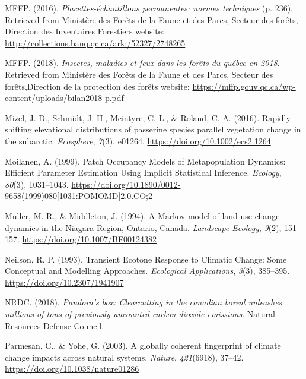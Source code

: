 \documentclass[a4paperpaper,]{article}
\begin{document}
\leavevmode\hypertarget{ref-mffp_placettes-echantillons_2016}{}%
MFFP. (2016). \emph{Placettes-échantillons permanentes: normes
techniques} (p. 236). Retrieved from Ministère des Forêts de la Faune et
des Parcs, Secteur des forêts, Direction des Inventaires Forestiers
website: \url{http://collections.banq.qc.ca/ark:/52327/2748265}

\leavevmode\hypertarget{ref-mffp_insectes_2018}{}%
MFFP. (2018). \emph{Insectes, maladies et feux dans les forêts du québec
en 2018}. Retrieved from Ministère des Forêts de la Faune et des Parcs,
Secteur des forêts,Direction de la protection des forêts website:
\url{https://mffp.gouv.qc.ca/wp-content/uploads/bilan2018-p.pdf}

\leavevmode\hypertarget{ref-mizel_rapidly_2016}{}%
Mizel, J. D., Schmidt, J. H., Mcintyre, C. L., \& Roland, C. A. (2016).
Rapidly shifting elevational distributions of passerine species parallel
vegetation change in the subarctic. \emph{Ecosphere}, \emph{7}(3),
e01264. \url{https://doi.org/10.1002/ecs2.1264}

\leavevmode\hypertarget{ref-moilanen_patch_1999}{}%
Moilanen, A. (1999). Patch Occupancy Models of Metapopulation Dynamics:
Efficient Parameter Estimation Using Implicit Statistical Inference.
\emph{Ecology}, \emph{80}(3), 1031--1043.
\href{https://doi.org/10.1890/0012-9658(1999)080\%5B1031:POMOMD\%5D2.0.CO;2}{https://doi.org/10.1890/0012-9658(1999)080{[}1031:POMOMD{]}2.0.CO;2}

\leavevmode\hypertarget{ref-muller_markov_1994}{}%
Muller, M. R., \& Middleton, J. (1994). A Markov model of land-use
change dynamics in the Niagara Region, Ontario, Canada. \emph{Landscape
Ecology}, \emph{9}(2), 151--157.
\url{https://doi.org/10.1007/BF00124382}

\leavevmode\hypertarget{ref-neilson_transient_1993}{}%
Neilson, R. P. (1993). Transient Ecotone Response to Climatic Change:
Some Conceptual and Modelling Approaches. \emph{Ecological
Applications}, \emph{3}(3), 385--395.
\url{https://doi.org/10.2307/1941907}

\leavevmode\hypertarget{ref-nrdc_pandoras_2018}{}%
NRDC. (2018). \emph{Pandora's box: Clearcutting in the canadian boreal
unleashes millions of tons of previously uncounted carbon dioxide
emissions}. Natural Resources Defense Council.

\leavevmode\hypertarget{ref-parmesan_globally_2003}{}%
Parmesan, C., \& Yohe, G. (2003). A globally coherent fingerprint of
climate change impacts across natural systems. \emph{Nature},
\emph{421}(6918), 37--42. \url{https://doi.org/10.1038/nature01286}
\end{document}
